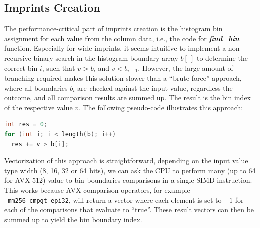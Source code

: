 \documentclass[sigconf]{acmart}
\begin{document}
\subsection{Imprints Creation}
The performance-critical part of imprints creation is the histogram bin assignment for each value from the column data,
i.e., the code for \textbf{\textit{find\_bin}} function. Especially for wide imprints, it seems intuitive to implement a non-recursive binary search in the histogram boundary array $b[\ ]$ to determine the correct bin $i$, such that $v > b_i$
and $v<b_{i+1}$. However, the large amount of branching required makes this solution slower than a ``brute-force'' approach,
where all boundaries $b_i$ are checked against the input value, regardless the outcome, and all comparison results are summed up. The result is the bin index of the respective value $v$. The following pseudo-code illustrates this approach:

\begin{lstlisting}[language=c]
int res = 0;
for (int i; i < length(b); i++)
  res += v > b[i];
\end{lstlisting}

Vectorization of this approach is straightforward, depending on the input value type width (8, 16, 32 or 64 bits), we can ask
the CPU to perform many (up to 64 for AVX-512) value-to-bin boundaries comparisons in a single SIMD instruction. This works
because AVX comparison operators, for example \texttt{\_mm256\_cmpgt\_epi32}, will return a vector where each element is set
to $-1$ for each of the comparisons that evaluate to ``true''. These result vectors can then be summed up to yield the
bin boundary index.
\end{document}
